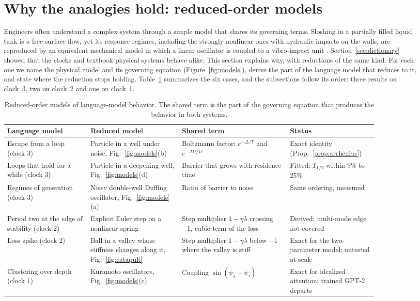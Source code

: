 \section{Why the analogies hold: reduced-order models}
\label{sec:reduced}

Engineers often understand a complex system through a simple model that shares its governing terms. Sloshing in a partially filled liquid tank is a free-surface flow, yet its response regimes, including the strongly nonlinear ones with hydraulic impacts on the walls, are reproduced by an equivalent mechanical model in which a linear oscillator is coupled to a vibro-impact unit \citep{farid2017response}. Section~\ref{sec:dictionary} showed that the clocks and textbook physical systems behave alike. This section explains why, with reductions of the same kind. For each one we name the physical model and its governing equation (Figure~\ref{fig:models}), derive the part of the language model that reduces to it, and state where the reduction stops holding. Table~\ref{tab:reduced} summarizes the six cases, and the subsections follow its order: three results on clock~3, two on clock~2 and one on clock~1.

\begin{table}[t]
\centering
\small
\caption{Reduced-order models of language-model behavior. The shared term is the part of the governing equation that produces the behavior in both systems.}
\label{tab:reduced}
\begin{tabular}{p{0.2\linewidth}p{0.22\linewidth}p{0.26\linewidth}p{0.21\linewidth}}
\toprule
Language model & Reduced model & Shared term & Status \\
\midrule
Escape from a loop (clock 3) & Particle in a well under noise, Fig.~\ref{fig:models}(b) & Boltzmann factor: $e^{-\Delta/T}$ and $e^{-\Delta U/D}$ & Exact identity (Prop.~\ref{prop:arrhenius}) \\
Loops that hold for a while (clock 3) & Particle in a deepening well, Fig.~\ref{fig:models}(d) & Barrier that grows with residence time & Fitted; $T_{1/2}$ within 9\% to 25\% \\
Regimes of generation (clock 3) & Noisy double-well Duffing oscillator, Fig.~\ref{fig:models}(a) & Ratio of barrier to noise & Same ordering, measured \\
Period two at the edge of stability (clock 2) & Explicit Euler step on a nonlinear spring & Step multiplier $1-\eta\lambda$ crossing $-1$, cubic term of the loss & Derived; multi-mode edge not covered \\
Loss spike (clock 2) & Ball in a valley whose stiffness changes along it, Fig.~\ref{fig:catapult} & Step multiplier $1-\eta\lambda$ below $-1$ where the valley is stiff & Exact for the two-parameter model; untested at scale \\
Clustering over depth (clock 1) & Kuramoto oscillators, Fig.~\ref{fig:models}(c) & Coupling $\sin(\psi_j-\psi_i)$ & Exact for idealized attention; trained GPT-2 departs \\
\bottomrule
\end{tabular}
\end{table}

